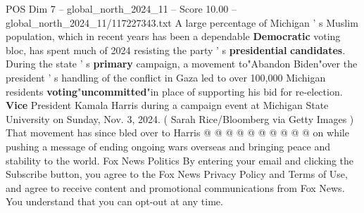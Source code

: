 \begin{textsample}{POS Dim 7 – global\_north\_2024\_11 – Score 10.00 – global\_north\_2024\_11/117227343.txt}
A large percentage of Michigan ' s Muslim population, which in recent years has been a dependable \textbf{Democratic} voting bloc, has spent much of 2024 resisting the party ' s \textbf{presidential} \textbf{candidates}.
During the state ' s \textbf{primary} campaign, a movement to"Abandon Biden"over the president ' s handling of the conflict in Gaza led to over 100,000 Michigan residents \textbf{voting}"\textbf{uncommitted}"in place of supporting his bid for re-election. \textbf{Vice} President Kamala Harris during a campaign event at Michigan State University on Sunday, Nov. 3, 2024. ( Sarah Rice/Bloomberg via Getty Images ) That movement has since bled over to Harris @ @ @ @ @ @ @ @ @ @ on while pushing a message of ending ongoing wars overseas and bringing peace and stability to the world.
Fox News Politics By entering your email and clicking the Subscribe button, you agree to the Fox News Privacy Policy and Terms of Use, and agree to receive content and promotional communications from Fox News.
You understand that you can opt-out at any time.

\end{textsample}
